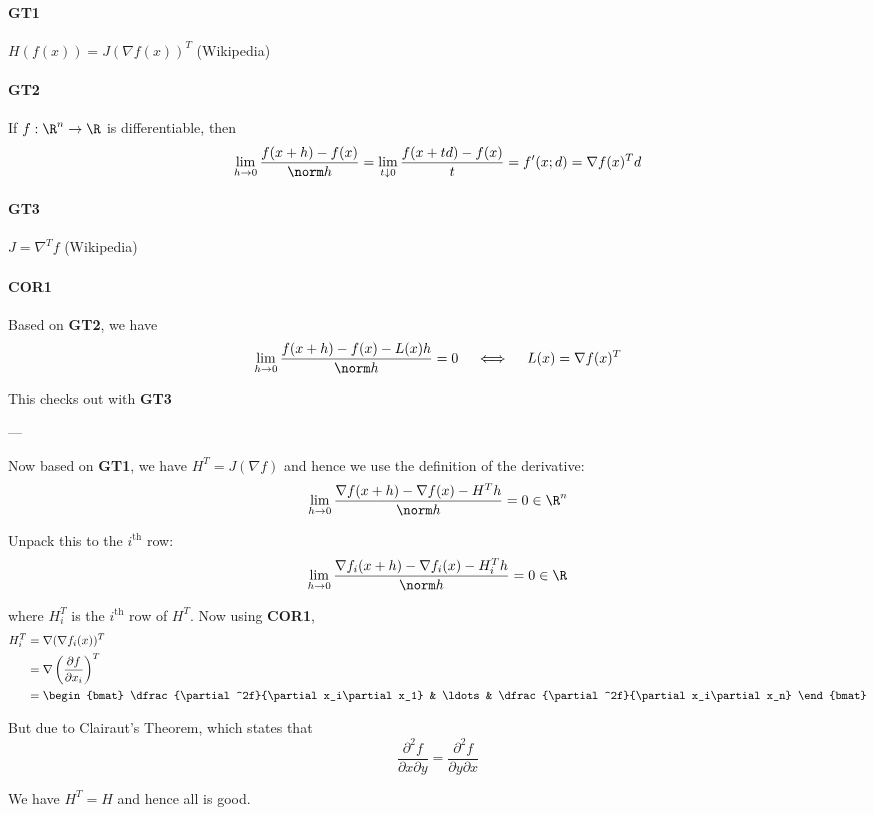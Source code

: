\newpage

\paragraph{GT1} $H(f(x))=J(\nabla f(x))^T$ (Wikipedia)
\paragraph{GT2} If $f:\R^n\to\R$ is differentiable, then
$$
  \lim_{h\to0}\frac{f(x+h)-f(x)}{\norm h}
  =\lim_{t\downarrow0}\frac{f(x+td)-f(x)}t
  =f'(x;d)
  =\nabla f(x)^Td
$$
\paragraph{GT3} $J=\nabla^Tf$ (Wikipedia)

\paragraph{COR1} Based on \textbf{GT2}, we have
$$
  \lim_{h\to0}\frac{f(x+h)-f(x)-L(x)h}{\norm h}=0\quad\iff\quad L(x)=\nabla f(x)^T
$$

This checks out with \textbf{GT3}

---

Now based on \textbf{GT1}, we have $H^T=J(\nabla f)$ and hence we use the
definition of the derivative:
\begin{align*}
  \lim_{h\to0}\frac{\nabla f(x+h)-\nabla f(x)-H^Th}{\norm h}=0\in\R^n
\end{align*}

Unpack this to the $i^\text{th}$ row:
\begin{align*}
  \lim_{h\to0}\frac{\nabla f_i(x+h)-\nabla f_i(x)-H_i^Th}{\norm h}=0\in\R
\end{align*}

where $H_i^T$ is the $i^\text{th}$ row of $H^T$. Now using \textbf{COR1},
\begin{align*}
  H_i^T
   &=\nabla(\nabla f_i(x))^T                              \\
   &=\nabla\left(\frac{\partial f}{\partial x_i}\right)^T \\
   &=\begin{bmat}
       \dfrac{\partial^2f}{\partial x_i\partial x_1} &
       \ldots                                        &
       \dfrac{\partial^2f}{\partial x_i\partial x_n}
     \end{bmat}
\end{align*}

But due to Clairaut's Theorem, which states that
$$
  \frac{\partial^2f}{\partial x\partial y}=
  \frac{\partial^2f}{\partial y\partial x}
$$

We have $H^T=H$ and hence all is good.
